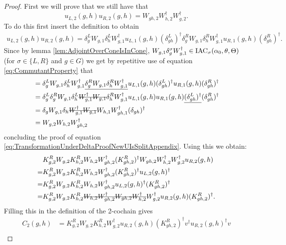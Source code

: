 \documentclass[12pt,a4paper,twoside]{article}
\numberwithin{equation}{section}
\begin{document}
\begin{proof}
	First we will prove that we still have that
	\begin{equation}\label{eq:TransformationUnderDeltaProofNewUIsSplitAppendix}
		u_{L,2}(g,h)u_{R,2}(g,h)=W_{gh,2}W_{h,2}^\dagger W_{g,2}^\dagger.
	\end{equation}
	To do this first insert the definition to obtain
	\begin{align}
		u_{L,2}(g,h)u_{R,2}(g,h)=\delta_g^L W_{g,1}\delta_h^L W_{g,1}^\dagger u_{L,1}(g,h)(\delta_{gh}^L)^\dagger \delta_g^R W_{g,1}\delta_h^R W_{g,1}^\dagger u_{R,1}(g,h)(\delta_{gh}^R)^\dagger.
	\end{align}
	Since by lemma \ref{lem:AdjointOverConeIsInCone}, $ W_{g,1}\delta_g^\sigma W_{g,1}^\dagger\in\textrm{IAC}_\sigma(\alpha_0,\theta,\Theta)$ (for $\sigma\in\{L,R\}$ and $g\in G$) we get by repetitive use of equation \eqref{eq:CommutantProperty} that
	\begin{align}
		&=\delta_g^L W_{g,1}\delta_h^L W_{g,1}^\dagger \underline{\delta_g^R W_{g,1}\delta_h^R W_{g,1}^\dagger} u_{L,1}(g,h)(\delta_{gh}^L)^\dagger  u_{R,1}(g,h)(\delta_{gh}^R)^\dagger\\
		&=\delta_g^L \delta_g^R W_{g,1}\delta_h^L \stkout{ W_{g,1}^\dagger W_{g,1}}\delta_h^R W_{g,1}^\dagger u_{L,1}(g,h)  u_{R,1}(g,h)\underline{(\delta_{gh}^L)^\dagger}(\delta_{gh}^R)^\dagger\\
		&=\delta_g W_{g,1}\delta_h \stkout{W_{g,1}^\dagger W_{g,1}} W_{h,1} W_{gh,1}^\dagger(\delta_{gh})^\dagger\\
		&=W_{g,2}W_{h,2}W_{gh,2}^\dagger
	\end{align}
	concluding the proof of equation \eqref{eq:TransformationUnderDeltaProofNewUIsSplitAppendix}. Using this we obtain:
	\begin{align}
		&K_{g,2}^RW_{g,2}K_{h,2}^{R}W_{h,2}W_{gh,2}^\dagger(K_{gh,2}^R)^\dagger W_{gh,2}W_{h,2}^\dagger W_{g,2}^\dagger u_{R,2}(g,h)\\
		=&K_{g,2}^RW_{g,2}K_{h,2}^{R}W_{h,2}W_{gh,2}^\dagger(K_{gh,2}^R)^\dagger u_{L,2}(g,h)^\dagger\\
		=&K_{g,2}^RW_{g,2}K_{h,2}^{R}W_{h,2}W_{gh,2}^\dagger u_{L,2}(g,h)^\dagger (K_{gh,2}^R)^\dagger\\
		=&K_{g,2}^RW_{g,2}K_{h,2}^{R}\stkout{W_{h,2}W_{gh,2}^\dagger W_{gh,2}W_{h,2}^\dagger} W_{g,2}^\dagger u_{R,2}(g,h) (K_{gh,2}^R)^\dagger.
	\end{align}
	Filling this in the definition of the 2-cochain gives
	\begin{align}
		C_2(g,h)&=K_{g,2}^RW_{g,2}K_{h,2}^{R}W_{g,2}^\dagger u_{R,2}(g,h) (K_{gh,2}^R)^\dagger v^\dagger u_{R,2}(g,h)^\dagger v\\

\end{align}
\end{proof}
\end{document}
